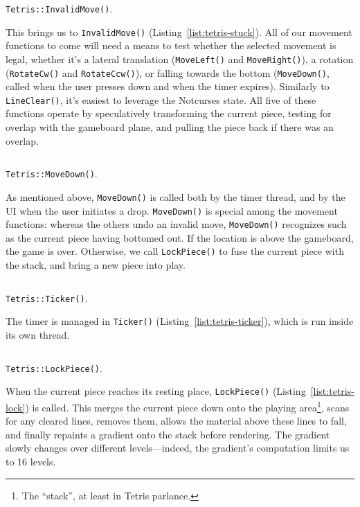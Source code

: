 \begin{listing}[!htb]
\inputminted[]{C}{code-tetris/stuck.h}
\caption{\texttt{Tetris::InvalidMove()}.}
\label{list:tetris-stuck}
\end{listing}

This brings us to \texttt{InvalidMove()} (Listing~\ref{list:tetris-stuck}).
All of our movement functions to come will need a means to test whether the
selected movement is legal, whether it's a lateral translation (\texttt{MoveLeft()}
and \texttt{MoveRight()}), a rotation (\texttt{RotateCw()} and \texttt{RotateCcw()}),
or falling towards the bottom (\texttt{MoveDown()}, called when the user presses
down and when the timer expires). Similarly to \texttt{LineClear()}, it's easiest
to leverage the Notcurses state. All five of these functions operate by speculatively
transforming the current piece, testing for overlap with the gameboard plane,
and pulling the piece back if there was an overlap.

\begin{listing}[!htb]
\inputminted[]{C}{code-tetris/movedown.h}
\caption{\texttt{Tetris::MoveDown()}.}
\label{list:tetris-movedown}
\end{listing}

As mentioned above, \texttt{MoveDown()} is called both by the timer thread,
and by the UI when the user initiates a drop. \texttt{MoveDown()} is special
among the movement functions: whereas the others undo an invalid move,
\texttt{MoveDown()} recognizes such as the current piece having bottomed out.
If the location is above the gameboard, the game is over. Otherwise, we
call \texttt{LockPiece()} to fuse the current piece with the stack, and bring
a new piece into play.

\begin{listing}[!htb]
\inputminted[]{C}{code-tetris/ticker.h}
\caption{\texttt{Tetris::Ticker()}.}
\label{list:tetris-ticker}
\end{listing}

The timer is managed in \texttt{Ticker()} (Listing~\ref{list:tetris-ticker}),
which is run inside its own thread.

\begin{listing}[!htb]
\inputminted[]{C}{code-tetris/lock.h}
\caption{\texttt{Tetris::LockPiece()}.}
\label{list:tetris-lock}
\end{listing}

When the current piece reaches its resting place, \texttt{LockPiece()} (Listing~\ref{list:tetris-lock})
is called. This merges the current piece down onto the playing area\footnote{The
``stack'', at least in Tetris parlance.}, scans for any cleared lines, removes
them, allows the material above these lines to fall, and finally repaints a
gradient onto the stack before rendering. The gradient slowly changes over
different levels---indeed, the gradient's computation limits us to 16 levels.

